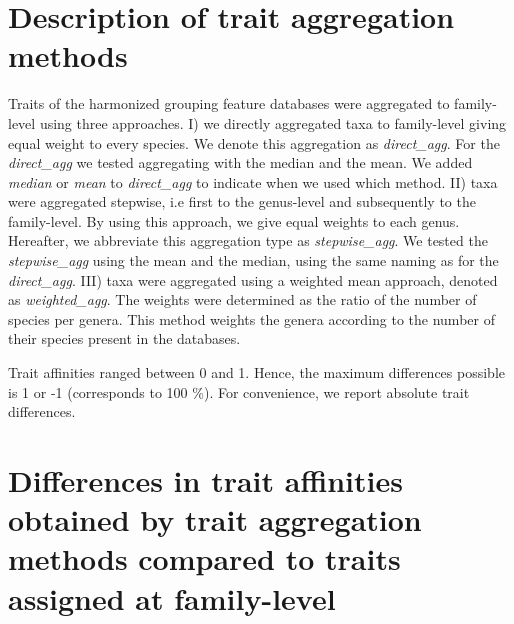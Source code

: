 \documentclass[../Draft_harmonization_paper.tex]{subfiles}
\begin{document}
\section{Description of trait aggregation methods}

Traits of the harmonized grouping feature databases were aggregated to family-level using three approaches. I) we directly aggregated taxa to family-level giving equal weight to every species. We denote this aggregation as \textit{direct\_agg}. For the \textit{direct\_agg} we tested aggregating with the median and the mean. We added \textit{median} or \textit{mean} to \textit{direct\_agg} to indicate when we used which method. II) taxa were aggregated stepwise, i.e first to the genus-level and subsequently to the family-level. By using this approach, we give equal weights to each genus. Hereafter, we abbreviate this aggregation type as \textit{stepwise\_agg}.
We tested the \textit{stepwise\_agg} using the mean and the median, using the same naming as for the \textit{direct\_agg}. III) taxa were aggregated using a weighted mean approach, denoted as \textit{weighted\_agg}. The weights were determined as the ratio of the number of species per genera. This method weights the genera according to the number of their species present in the databases.

Trait affinities ranged between 0 and 1. Hence, the maximum differences possible is 1 or -1 (corresponds to 100 \%). For convenience, we report absolute trait differences.

\section{Differences in trait affinities obtained by trait aggregation methods compared to traits assigned at family-level}
\label{sec:diff_trait_agg_chessman}
\end{document}
